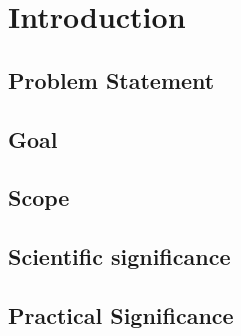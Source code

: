 \chapter{Introduction}
\section{Problem Statement}
\section{Goal}
\section{Scope}
\section{Scientific significance}
\section{Practical Significance}

